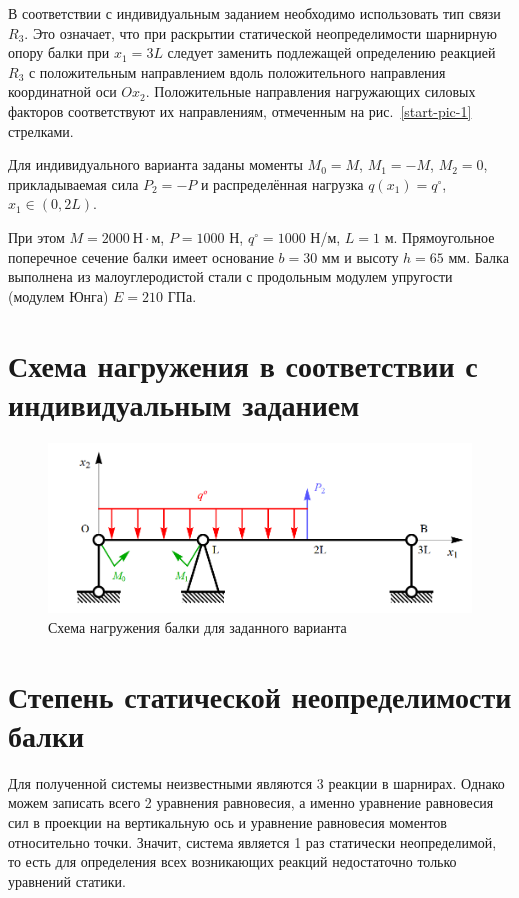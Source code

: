 \documentclass[12pt, a4paper]{article}
\begin{document}
	В соответствии с индивидуальным заданием необходимо использовать тип связи $R_3$. Это означает, что при раскрытии статической неопределимости шарнирную опору балки при $x_1 = 3L$ следует заменить подлежащей определению реакцией $R_3$ с положительным направлением вдоль положительного направления координатной оси $Ox_2$. Положительные направления нагружающих силовых факторов соответствуют их направлениям, отмеченным на рис.~\ref{start-pic-1} стрелками. 
	
	Для индивидуального варианта заданы моменты $M_0 = M$, $M_1 = -M$, $M_2 = 0$, прикладываемая сила $P_2 = -P$ и распределённая нагрузка $q(x_1) = q^{\circ}$, $x_1 \in (0, 2L)$. 
	
	При этом $M = 2000 \ \text{Н} \! \cdot \! \text{м}$, $P = 1000$ Н, $q^{\circ} = 1000$ Н/м, $L = 1$ м. Прямоугольное поперечное сечение балки имеет основание $b = 30$ мм и высоту $h = 65$ мм. Балка выполнена из малоуглеродистой стали с продольным модулем упругости (модулем Юнга) $E = 210$ ГПа.
	
	\newpage
	
	\section{Схема нагружения в соответствии с индивидуальным заданием}
	
	\vspace{-1em}
	
	\begin{figure}[!h]
		\centering
		\includegraphics[width=0.75\linewidth]{plot-2}
		\caption{Схема нагружения балки для заданного варианта}
	\end{figure}
	
	\section{Степень статической неопределимости балки}
	
	Для полученной системы неизвестными являются 3 реакции в шарнирах. Однако можем записать всего 2 уравнения равновесия, а именно уравнение равновесия сил в проекции на вертикальную ось и уравнение равновесия моментов относительно точки. Значит, система является 1 раз статически неопределимой, то есть для определения всех возникающих реакций недостаточно только уравнений статики.
	
\end{document}
